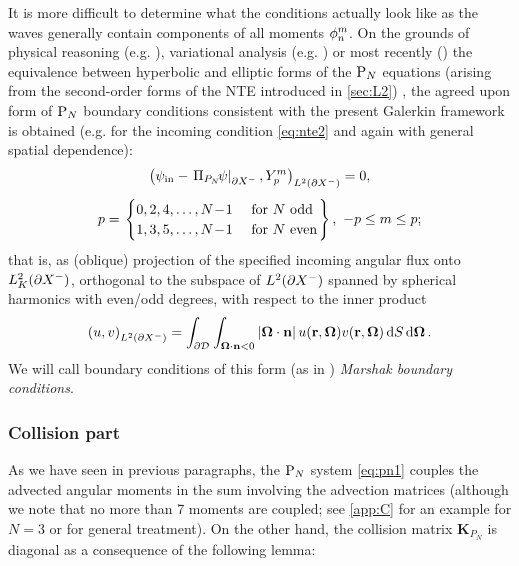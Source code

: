 It is more difficult to determine what the conditions actually look like as the
waves generally contain components of all moments $\angmom{n}{m}$. On the grounds of physical reasoning
(e.g. \cite{Rumyantsev}), variational analysis (e.g. \cite{Davis}) or most recently (\cite{Sanchez8}) the equivalence
between hyperbolic and elliptic forms of the $\PN$ equations (arising from the second-order forms of the NTE introduced
in \ref{sec:L2}) , the agreed upon form of $\PN$ boundary conditions consistent with the present Galerkin framework is
obtained (e.g. for the incoming condition \eqref{eq:nte2} and again with general spatial dependence):
\begin{equation}\label{eq:pn_bc}
\begin{gathered}
	\left(\psi_\text{in} - \left.\Projop[P_N]\!\psi\right\vert_{\pX[-]}, \Y{p}{m} \right)_{\Lp[2](\pX[-])} = 0,\\[.35em] 
	p = 
	\left.\begin{cases}
		0,2,4,\ldots,N\!-\!1 & \mbox{ for $N$ odd}\\
		1,3,5,\ldots,N\!-\!1 & \mbox{ for $N$ even}	
	\end{cases}\right\},\ -p \leq m \leq p;
\end{gathered}
\end{equation}
that is, as (oblique) projection of the specified incoming angular flux onto $\Lp[2]_{K}(\pX[-])$,
orthogonal to the subspace of $\Lp[2](\pX[-])$ spanned by spherical harmonics with even/odd degrees, with respect to the inner
product
$$
	\left(u,v\right)_{\Lp[2](\pX[-])} = \int_{\pV}\int_{\bomega\cdot\bn < 0}\abs{\bomega\cdot\bn}
	u(\br,\bomega)v(\br,\bomega)\,\d{S}\d{\bomega}.
$$
 We will call boundary conditions of this form (as in \cite{Davis}) \textit{Marshak boundary
conditions}.

\subsubsection{Collision part}
As we have seen in previous paragraphs, the $\PN$ system \eqref{eq:pn1} couples the advected angular moments in the sum
involving the advection matrices (although we note that no more than 7 moments are coupled; see \ref{app:C} for an
example for $N = 3$ or \cite[App. A]{Sanchez8} for general treatment). 
On the other hand, the collision matrix $\mathbf{K}_{P_N}$ is
diagonal as
 a consequence of the following lemma:

